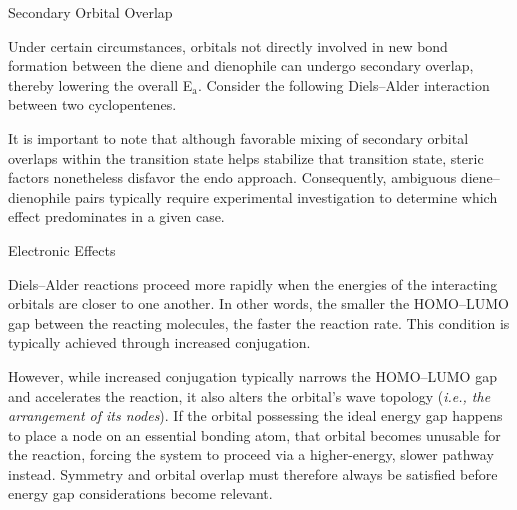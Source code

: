     \begin{core}{Secondary Orbital Overlap}

      Under certain circumstances, orbitals not directly involved in new bond formation between the diene and dienophile can undergo secondary overlap, thereby lowering the overall E$_\text{a}$. Consider the following Diels--Alder interaction between two cyclopentenes.

      \vspace{-0.4cm}

      It is important to note that although favorable mixing of secondary orbital overlaps within the transition state helps stabilize that transition state, steric factors nonetheless disfavor the endo approach. Consequently, ambiguous diene--dienophile pairs typically require experimental investigation to determine which effect predominates in a given case.

    \end{core}

    \begin{core}{Electronic Effects}

      Diels--Alder reactions proceed more rapidly when the energies of the interacting orbitals are closer to one another. In other words, the smaller the HOMO--LUMO gap between the reacting molecules, the faster the reaction rate. This condition is typically achieved through increased conjugation.

      However, while increased conjugation typically narrows the HOMO--LUMO gap and accelerates the reaction, it also alters the orbital's wave topology (\textit{i.e., the arrangement of its nodes}). If the orbital possessing the ideal energy gap happens to place a node on an essential bonding atom, that orbital becomes unusable for the reaction, forcing the system to proceed via a higher-energy, slower pathway instead. Symmetry and orbital overlap must therefore always be satisfied before energy gap considerations become relevant.


    \end{core}

